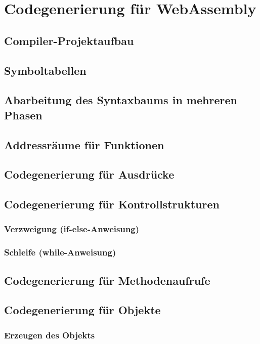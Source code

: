 \chapter{Codegenerierung für WebAssembly}

\section{Compiler-Projektaufbau}

\section{Symboltabellen}

\section{Abarbeitung des Syntaxbaums in mehreren Phasen}

\section{Addressräume für Funktionen}

\section{Codegenerierung für Ausdrücke}

\section{Codegenerierung für Kontrollstrukturen}
\subsection{Verzweigung (if-else-Anweisung)}
\subsection{Schleife (while-Anweisung)}

\section{Codegenerierung für Methodenaufrufe}

\section{Codegenerierung für Objekte}
\subsection{Erzeugen des Objekts}
